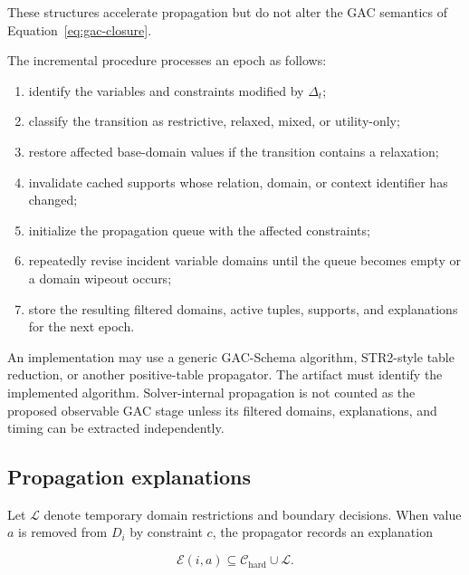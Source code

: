 \documentclass[pdflatex,sn-mathphys-num,iicol,oneside]{sn-jnl}
\begin{document}
These structures accelerate propagation but do not alter the GAC
semantics of Equation~\eqref{eq:gac-closure}.

The incremental procedure processes an epoch as follows:

\begin{enumerate}
    \item identify the variables and constraints modified by
    $\Delta_t$;

    \item classify the transition as restrictive, relaxed, mixed, or
    utility-only;

    \item restore affected base-domain values if the transition
    contains a relaxation;

    \item invalidate cached supports whose relation, domain, or
    context identifier has changed;

    \item initialize the propagation queue with the affected
    constraints;

    \item repeatedly revise incident variable domains until the queue
    becomes empty or a domain wipeout occurs;

    \item store the resulting filtered domains, active tuples,
    supports, and explanations for the next epoch.
\end{enumerate}

An implementation may use a generic GAC-Schema algorithm,
STR2-style table reduction, or another positive-table propagator.
The artifact must identify the implemented algorithm. Solver-internal
propagation is not counted as the proposed observable GAC stage unless
its filtered domains, explanations, and timing can be extracted
independently.

\subsection{Propagation explanations}

Let $\mathcal{L}$ denote temporary domain restrictions and boundary
decisions. When value $a$ is removed from $D_i$ by constraint $c$, the
propagator records an explanation

\begin{equation}
\mathcal{E}(i,a)
\subseteq
\mathcal{C}_{\mathrm{hard}}
\cup
\mathcal{L}.
\label{eq:value-explanation}
\end{equation}
\end{document}
